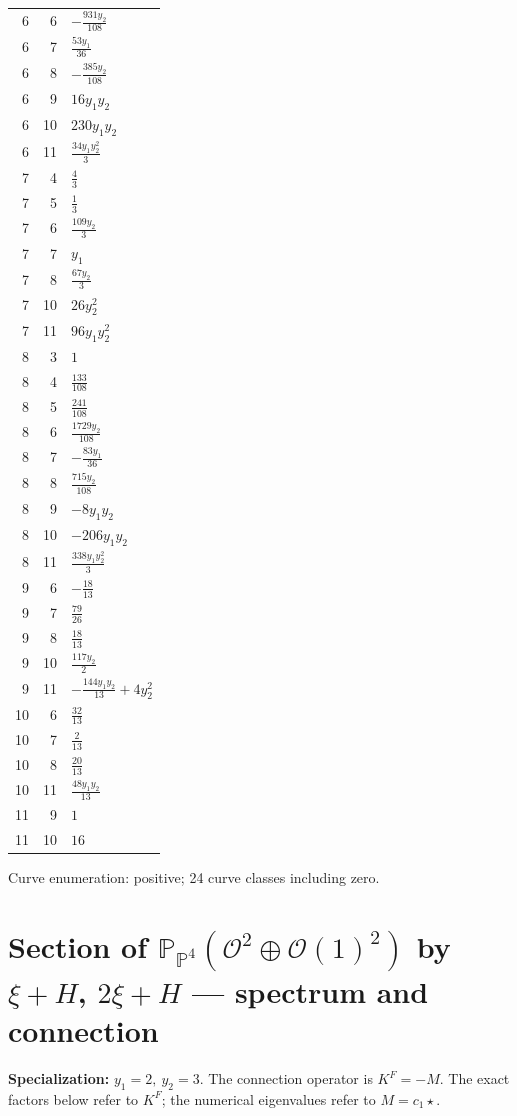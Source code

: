 \documentclass[10pt,a4paper]{article}
\begin{document}
{\begin{longtable}{rrp{125mm}}
6 & 6 & $- \frac{931 y_{2}}{108}$\\
6 & 7 & $\frac{53 y_{1}}{36}$\\
6 & 8 & $- \frac{385 y_{2}}{108}$\\
6 & 9 & $16 y_{1} y_{2}$\\
6 & 10 & $230 y_{1} y_{2}$\\
6 & 11 & $\frac{34 y_{1} y_{2}^{2}}{3}$\\
7 & 4 & $\frac{4}{3}$\\
7 & 5 & $\frac{1}{3}$\\
7 & 6 & $\frac{109 y_{2}}{3}$\\
7 & 7 & $y_{1}$\\
7 & 8 & $\frac{67 y_{2}}{3}$\\
7 & 10 & $26 y_{2}^{2}$\\
7 & 11 & $96 y_{1} y_{2}^{2}$\\
8 & 3 & $1$\\
8 & 4 & $\frac{133}{108}$\\
8 & 5 & $\frac{241}{108}$\\
8 & 6 & $\frac{1729 y_{2}}{108}$\\
8 & 7 & $- \frac{83 y_{1}}{36}$\\
8 & 8 & $\frac{715 y_{2}}{108}$\\
8 & 9 & $- 8 y_{1} y_{2}$\\
8 & 10 & $- 206 y_{1} y_{2}$\\
8 & 11 & $\frac{338 y_{1} y_{2}^{2}}{3}$\\
9 & 6 & $- \frac{18}{13}$\\
9 & 7 & $\frac{79}{26}$\\
9 & 8 & $\frac{18}{13}$\\
9 & 10 & $\frac{117 y_{2}}{2}$\\
9 & 11 & $- \frac{144 y_{1} y_{2}}{13} + 4 y_{2}^{2}$\\
10 & 6 & $\frac{32}{13}$\\
10 & 7 & $\frac{2}{13}$\\
10 & 8 & $\frac{20}{13}$\\
10 & 11 & $\frac{48 y_{1} y_{2}}{13}$\\
11 & 9 & $1$\\
11 & 10 & $16$\\
\end{longtable}}
Curve enumeration: positive; 24 curve classes including zero.
\clearpage\section*{Section of $\mathbb P_{\mathbb P^{4}}(\mathcal O^{2}\oplus \mathcal O(1)^{2})$ by $\xi +H$, $2\xi +H$ --- spectrum and connection}
\textbf{Specialization:} $y_1=2,\ y_2=3$. The connection operator is $K^F=-M$. The exact factors below refer to $K^F$; the numerical eigenvalues refer to $M=c_1\star$.
\end{document}
